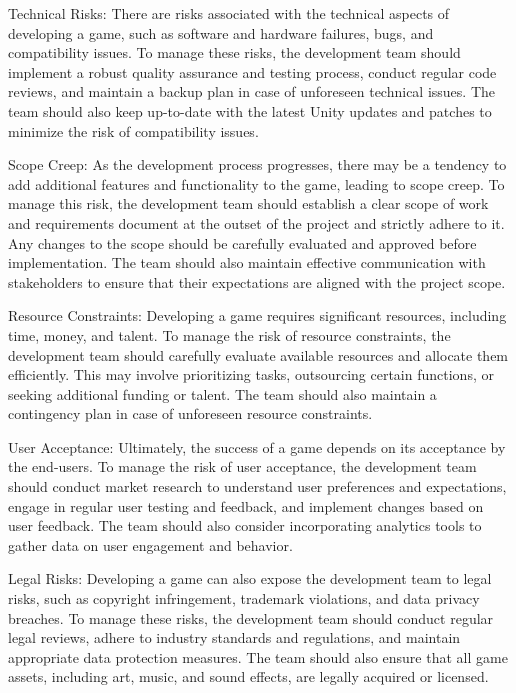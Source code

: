 \documentclass[12pt]{report}
\begin{document}
Technical Risks: There are risks associated with the technical aspects of developing a game, such as software and hardware failures, bugs, and compatibility issues. To manage these risks, the development team should implement a robust quality assurance and testing process, conduct regular code reviews, and maintain a backup plan in case of unforeseen technical issues. The team should also keep up-to-date with the latest Unity updates and patches to minimize the risk of compatibility issues.

Scope Creep: As the development process progresses, there may be a tendency to add additional features and functionality to the game, leading to scope creep. To manage this risk, the development team should establish a clear scope of work and requirements document at the outset of the project and strictly adhere to it. Any changes to the scope should be carefully evaluated and approved before implementation. The team should also maintain effective communication with stakeholders to ensure that their expectations are aligned with the project scope.

Resource Constraints: Developing a game requires significant resources, including time, money, and talent. To manage the risk of resource constraints, the development team should carefully evaluate available resources and allocate them efficiently. This may involve prioritizing tasks, outsourcing certain functions, or seeking additional funding or talent. The team should also maintain a contingency plan in case of unforeseen resource constraints.

User Acceptance: Ultimately, the success of a game depends on its acceptance by the end-users. To manage the risk of user acceptance, the development team should conduct market research to understand user preferences and expectations, engage in regular user testing and feedback, and implement changes based on user feedback. The team should also consider incorporating analytics tools to gather data on user engagement and behavior.

Legal Risks: Developing a game can also expose the development team to legal risks, such as copyright infringement, trademark violations, and data privacy breaches. To manage these risks, the development team should conduct regular legal reviews, adhere to industry standards and regulations, and maintain appropriate data protection measures. The team should also ensure that all game assets, including art, music, and sound effects, are legally acquired or licensed.
\end{document}
